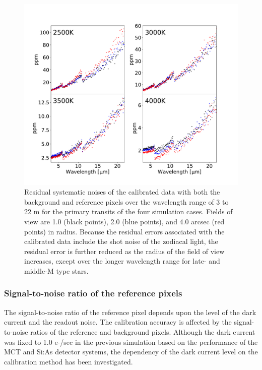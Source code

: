 \documentclass{aastex62}
\begin{document}
\begin{figure}[H]
\begin{center}
\includegraphics[width=12cm]{sn_zodi.pdf}
\caption{Residual systematic noises of the calibrated data with both the background and reference pixels over the wavelength range of 3 to 22 \textmu m for the primary transits of the four simulation cases. Fields of view are 1.0 (black points), 2.0 (blue points), and 4.0 arcsec (red points) in radius. Because the residual errors associated with the calibrated data include the shot noise of the zodiacal light, the residual error is further reduced as the radius of the field of view increases, except over the longer wavelength range for late- and middle-M type stars. \label{fig:sn_zodi}}
\end{center}
\end{figure}


\subsubsection{Signal-to-noise ratio of the reference pixels} \label{subsubsec:sn_dark}

The signal-to-noise ratio of the reference pixel depends upon the level of the dark current and the readout noise. The calibration accuracy is affected by the signal-to-noise ratios of the reference and background pixels. Although the dark current was fixed to 1.0 e-/sec in the previous simulation based on the performance of the MCT and Si:As detector systems, the dependency of the dark current level on the calibration method has been investigated.
\end{document}
